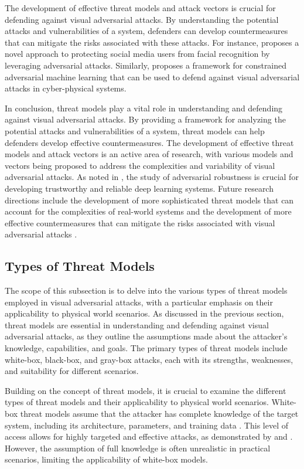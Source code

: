 \documentclass[11pt,a4paper]{article}
\begin{document}
The development of effective threat models and attack vectors is crucial for defending against visual adversarial attacks. By understanding the potential attacks and vulnerabilities of a system, defenders can develop countermeasures that can mitigate the risks associated with these attacks. For instance, \cite{arxiv:2101.07922} proposes a novel approach to protecting social media users from facial recognition by leveraging adversarial attacks. Similarly, \cite{doi:10.1145/3433210.3437513} proposes a framework for constrained adversarial machine learning that can be used to defend against visual adversarial attacks in cyber-physical systems.

In conclusion, threat models play a vital role in understanding and defending against visual adversarial attacks. By providing a framework for analyzing the potential attacks and vulnerabilities of a system, threat models can help defenders develop effective countermeasures. The development of effective threat models and attack vectors is an active area of research, with various models and vectors being proposed to address the complexities and variability of visual adversarial attacks. As noted in \cite{doi:10.1145/3459637.3482029}, the study of adversarial robustness is crucial for developing trustworthy and reliable deep learning systems. Future research directions include the development of more sophisticated threat models that can account for the complexities of real-world systems and the development of more effective countermeasures that can mitigate the risks associated with visual adversarial attacks \cite{doi:10.1109/jiot.2021.3099164}.


\subsection{Types of Threat Models}


The scope of this subsection is to delve into the various types of threat models employed in visual adversarial attacks, with a particular emphasis on their applicability to physical world scenarios. As discussed in the previous section, threat models are essential in understanding and defending against visual adversarial attacks, as they outline the assumptions made about the attacker's knowledge, capabilities, and goals. The primary types of threat models include white-box, black-box, and gray-box attacks, each with its strengths, weaknesses, and suitability for different scenarios.

Building on the concept of threat models, it is crucial to examine the different types of threat models and their applicability to physical world scenarios. White-box threat models assume that the attacker has complete knowledge of the target system, including its architecture, parameters, and training data \cite{arxiv:1810.00069}. This level of access allows for highly targeted and effective attacks, as demonstrated by \cite{arxiv:1707.07397} and \cite{arxiv:1707.08945}. However, the assumption of full knowledge is often unrealistic in practical scenarios, limiting the applicability of white-box models.
\end{document}
